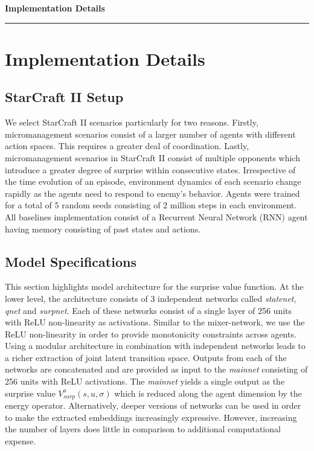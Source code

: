 \documentclass[11pt,letterpaper]{article}
\begin{document}
\begin{center}
\textbf{\large Implementation Details}
\hrule
\end{center}

\section{Implementation Details}

\subsection{StarCraft II Setup}
We select StarCraft II scenarios particularly for two reasons. Firstly, micromanagement scenarios consist of a larger number of agents with different action spaces. This requires a greater deal of coordination. Lastly, micromanagement scenarios in StarCraft II consist of multiple opponents which introduce a greater degree of surprise within consecutive states. Irrespective of the time evolution of an episode, environment dynamics of each scenario change rapidly as the agents need to respond to enemy's behavior. Agents were trained for a total of 5 random seeds consisting of 2 million steps in each environment. All baselines implementation consist of a Recurrent Neural Network (RNN) agent having memory consisting of past states and actions.

\subsection{Model Specifications}
This section highlights model architecture for the surprise value function. At the lower level, the architecture consists of 3 independent networks called \textit{state\textunderscore net}, \textit{q\textunderscore net} and \textit{surp\textunderscore net}. Each of these networks consist of a single layer of 256 units with ReLU non-linearity as activations. Similar to the mixer-network, we use the ReLU non-linearity in order to provide monotonicity constraints across agents. Using a modular architecture in combination with independent networks leads to a richer extraction of joint latent transition space. Outputs from each of the networks are concatenated and are provided as input to the \textit{main\textunderscore net} consisting of 256 units with ReLU activations. The \textit{main\textunderscore net} yields a single output as the surprise value $V^{a}_{surp}(s,u,\sigma)$ which is reduced along the agent dimension by the energy operator. Alternatively, deeper versions of networks can be used in order to make the extracted embeddings increasingly expressive. However, increasing the number of layers does little in comparison to additional computational expense.  
\end{document}
